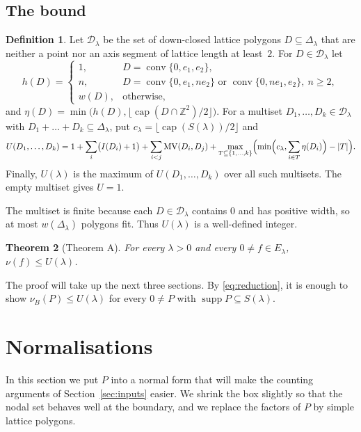 \documentclass[11pt]{amsart}
\newtheorem{theorem}{Theorem}[section]
\theoremstyle{definition}
\newtheorem{definition}[theorem]{Definition}
\theoremstyle{remark}
\newcommand{\Z}{\mathbb{Z}}
\newcommand{\MV}{\operatorname{MV}}
\newcommand{\conv}{\operatorname{conv}}
\newcommand{\capn}{\operatorname{cap}}
\newcommand{\supp}{\operatorname{supp}}
\numberwithin{equation}{section}
\begin{document}
\subsection{The bound}
\begin{definition}\label{def:U}
Let $\mathcal D_\lambda$ be the set of down-closed lattice polygons $D\subseteq\Delta_\lambda$
that are neither a point nor an axis segment of lattice length at least~$2$. For
$D\in\mathcal D_\lambda$ let
\[
h(D)=\begin{cases}1, & D=\conv\{0,e_1,e_2\},\\
n, & D=\conv\{0,e_1,ne_2\}\text{ or }\conv\{0,ne_1,e_2\},\ n\ge2,\\
w(D), & \text{otherwise,}\end{cases}
\]
and $\eta(D)=\min\bigl(h(D),\lfloor\capn(D\cap\Z^2)/2\rfloor\bigr)$.
For a multiset $D_1,\dots,D_k\in\mathcal D_\lambda$ with $D_1+\dots+D_k\subseteq\Delta_\lambda$,
put $c_\lambda=\lfloor\capn(S(\lambda))/2\rfloor$ and
\begin{equation}\label{eq:Umulti}
U(D_1,\dots,D_k)=1+\sum_{i}\bigl(I(D_i)+1\bigr)+\sum_{i<j}\MV(D_i,D_j)
+\max_{T\subseteq\{1,\dots,k\}}\Bigl(\min\Bigl(c_\lambda,\sum_{i\in T}\eta(D_i)\Bigr)-|T|\Bigr).
\end{equation}
Finally, $U(\lambda)$ is the maximum of $U(D_1,\dots,D_k)$ over all such multisets. The empty
multiset gives $U=1$.
\end{definition}

The multiset is finite because each $D\in\mathcal D_\lambda$ contains $0$ and has positive
width, so at most $w(\Delta_\lambda)$ polygons fit. Thus $U(\lambda)$ is a well-defined
integer.

\begin{theorem}[Theorem A]\label{thm:main}
For every $\lambda>0$ and every $0\ne f\in E_\lambda$, $\nu(f)\le U(\lambda)$.
\end{theorem}

The proof will take up the next three sections. By \eqref{eq:reduction}, it is enough to show $\nu_B(P)\le U(\lambda)$ for every $0\ne P$ with $\supp P\subseteq S(\lambda)$.

\section{Normalisations}\label{sec:normal}

In this section we put $P$ into a normal form that will make the counting arguments of
Section~\ref{sec:inputs} easier. We shrink the box slightly so that the nodal set behaves well
at the boundary, and we replace the factors of $P$ by simple lattice polygons.
\end{document}
